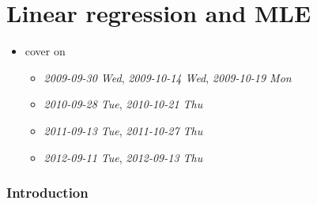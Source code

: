 
\part{Linear regression and MLE}

\begin{itemize}
\item cover on
\begin{itemize}
\item \textit{2009-09-30 Wed}, \textit{2009-10-14 Wed}, \textit{2009-10-19 Mon}
\item \textit{2010-09-28 Tue}, \textit{2010-10-21 Thu}
\item \textit{2011-09-13 Tue}, \textit{2011-10-27 Thu}
\item \textit{2012-09-11 Tue}, \textit{2012-09-13 Thu}
\end{itemize}
\end{itemize}
\section{Introduction}
\label{sec-1}

